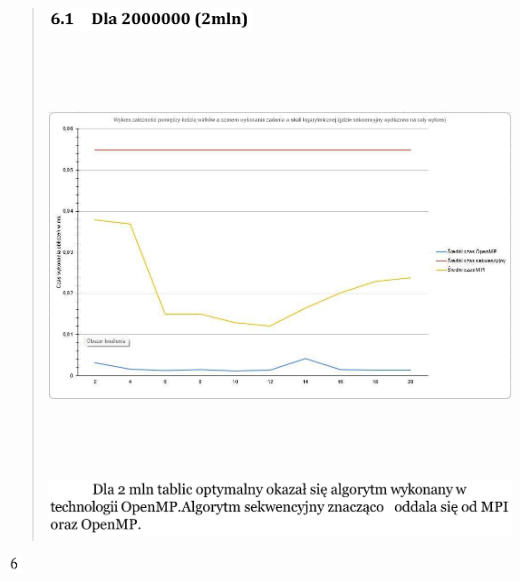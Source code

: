 \documentclass[
]{article}
\begin{document}
\begin{quote}
\includegraphics[width=2.13889in,height=0.23611in]{vertopal_45f5e71363bf454ba37a280ca069ec4b/media/image25.png}

\includegraphics[width=6.90417in,height=4.2875in]{vertopal_45f5e71363bf454ba37a280ca069ec4b/media/image26.png}

\includegraphics[width=4.95833in,height=0.59722in]{vertopal_45f5e71363bf454ba37a280ca069ec4b/media/image27.png}
\end{quote}

\includegraphics[width=0.15278in,height=0.18056in]{vertopal_45f5e71363bf454ba37a280ca069ec4b/media/image28.png}
\end{document}
